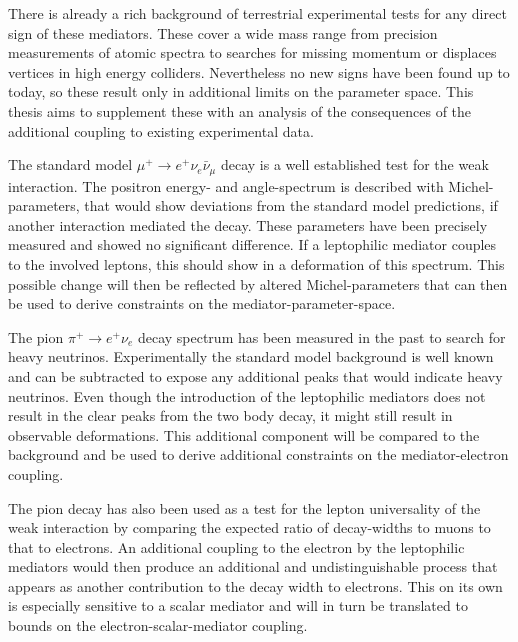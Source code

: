 There is already a rich background of terrestrial experimental tests for any direct sign of these mediators. These cover a wide mass range from precision measurements of atomic spectra to searches for missing momentum or displaces vertices in high energy colliders. Nevertheless no new signs have been found up to today, so these result only in additional limits on the parameter space. This thesis aims to supplement these with an analysis of the consequences of the additional coupling to existing experimental data.

The standard model $\mu^+\rightarrow e^+ \nu_e \bar{\nu}_\mu$ decay is a well established test for the weak interaction. The positron energy- and angle-spectrum is described with Michel-parameters, that would show deviations from the standard model predictions, if another interaction mediated the decay. These parameters have been precisely measured and showed no significant difference. If a leptophilic mediator couples to the involved leptons, this should show in a deformation of this spectrum. This possible change will then be reflected by altered Michel-parameters that can then be used to derive constraints on the mediator-parameter-space.

The pion $\pi^+\rightarrow e^+ \nu_e$ decay spectrum has been measured in the past to search for heavy neutrinos. Experimentally the standard model background is well known and can be subtracted to expose any additional peaks that would indicate heavy neutrinos. Even though the introduction of the leptophilic mediators does not result in the clear peaks from the two body decay, it might still result in observable deformations. This additional component will be compared to the background and be used to derive additional constraints on the mediator-electron coupling. 

The pion decay has also been used as a test for the lepton universality of the weak interaction by comparing the expected ratio of decay-widths to muons to that to electrons. An additional coupling to the electron by the leptophilic mediators would then produce an additional and undistinguishable process that appears as another contribution to the decay width to electrons. This on its own is especially sensitive to a scalar mediator and will in turn be translated to bounds on the electron-scalar-mediator coupling.


